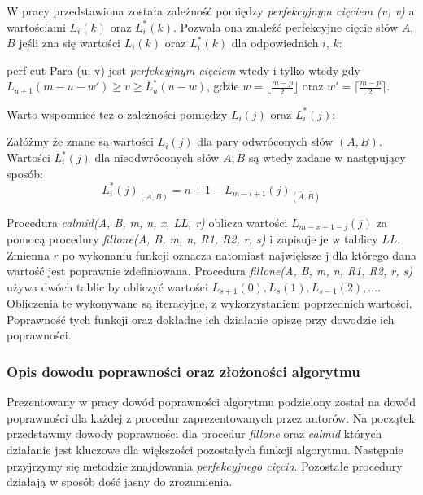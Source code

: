 \noindent W pracy przedstawiona została zależność pomiędzy \textit{perfekcyjnym cięciem (u, v)} a wartościami $L_i(k)$ oraz $L_i^*(k)$. Pozwala ona znaleźć perfekcyjne cięcie słów $A$, $B$ jeśli zna się wartości $L_i(k)$ oraz $L_i^*(k)$ dla odpowiednich $i$, $k$:
\begin{theorem}{}{perf-cut}
Para (u, v) jest \textit{perfekcyjnym cięciem} wtedy i tylko wtedy gdy $L_{u+1}(m - u - w') \geq v \geq L^*_u(u - w)$, gdzie $w = \lfloor\frac{m-p}{2}\rfloor$ oraz $w' = \lceil\frac{m-p}{2}\rceil$.
\end{theorem}
Warto wspomnieć też o zależności pomiędzy $L_i(j)$ oraz $L_i^*(j)$:
\begin{lemma}{}{}
Załóżmy że znane są wartości $L_i(j)$ dla pary odwróconych słów $(A, B)$. Wartości $L_i^*(j)$ dla nieodwróconych słów $A, B$ są wtedy zadane w następujący sposób:
\[
    L_i^*(j)_{(A, B)} = n + 1 - L_{m-i+1}(j)_{(\bar{A}, \bar{B})}
\]
\end{lemma}
Procedura \textit{calmid(A, B, m, n, x, LL, r)} oblicza wartości $L_{m-x+1-j}(j)$ za pomocą procedury \textit{fillone(A, B, m, n, R1, R2, r, s)} i zapisuje je w tablicy $LL$. Zmienna $r$ po wykonaniu funkcji oznacza natomiast największe j dla którego dana wartość jest poprawnie zdefiniowana. Procedura \textit{fillone(A, B, m, n, R1, R2, r, s)} używa dwóch tablic by obliczyć wartości $L_{s+1}(0), L_s(1), L_{s-1}(2), ...$. Obliczenia te wykonywane są iteracyjne, z wykorzystaniem poprzednich wartości. Poprawność tych funkcji oraz dokładne ich działanie opiszę przy dowodzie ich poprawności.
\subsubsection{Opis dowodu poprawności oraz złożoności algorytmu}
Prezentowany w pracy dowód poprawności algorytmu podzielony został na dowód poprawności dla każdej z procedur zaprezentowanych przez autorów. Na początek przedstawmy dowody poprawności dla procedur \textit{fillone} oraz \textit{calmid} których działanie jest kluczowe dla większości pozostałych funkcji algorytmu. Następnie przyjrzymy się metodzie znajdowania \textit{perfekcyjnego cięcia}. Pozostałe procedury działają w sposób dość jasny do zrozumienia.
